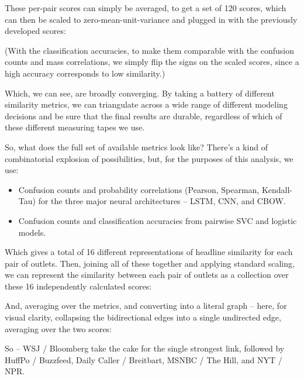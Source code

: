 \documentclass{scrartcl}
\begin{document}

These per-pair scores can simply be averaged, to get a set of 120 scores, which can then be scaled to zero-mean-unit-variance and plugged in with the previously developed scores:


(With the classification accuracies, to make them comparable with the confusion counts and mass correlations, we simply flip the signs on the scaled scores, since a high accuracy corresponds to low similarity.)

Which, we can see, are broadly converging. By taking a battery of different similarity metrics, we can triangulate across a wide range of different modeling decisions and be sure that the final results are durable, regardless of which of these different measuring tapes we use.

So, what does the full set of available metrics look like? There's a kind of combinatorial explosion of possibilities, but, for the purposes of this analysis, we use:

\begin{itemize}
\item Confusion counts and probability correlations (Pearson, Spearman, Kendall-Tau) for the three major neural architectures -- LSTM, CNN, and CBOW.
\item Confusion counts and classification accuracies from pairwise SVC and logistic models.
\end{itemize}

Which gives a total of 16 different representations of headline similarity for each pair of outlets. Then, joining all of these together and applying standard scaling, we can represent the similarity between each pair of outlets as a collection over these 16 independently calculated scores:


And, averaging over the metrics, and converting into a literal graph -- here, for visual clarity, collapsing the bidirectional edges into a single undirected edge, averaging over the two scores:


So -- WSJ / Bloomberg take the cake for the single strongest link, followed by HuffPo / Buzzfeed, Daily Caller / Breitbart, MSNBC / The Hill, and NYT / NPR.
\end{document}
